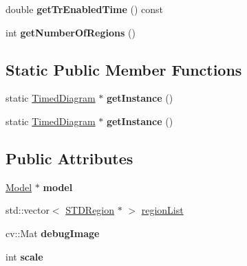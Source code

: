 \begin{DoxyCompactItemize}
\item 
\hypertarget{classTimedDiagram_a5fadc1d768a55ee74864ee05dc1c7c23}{double {\bfseries get\-Tr\-Enabled\-Time} () const }\label{classTimedDiagram_a5fadc1d768a55ee74864ee05dc1c7c23}

\item 
\hypertarget{classTimedDiagram_aa0eafacca33acf296c5bd1219f12fed8}{int {\bfseries get\-Number\-Of\-Regions} ()}\label{classTimedDiagram_aa0eafacca33acf296c5bd1219f12fed8}

\end{DoxyCompactItemize}
\subsection*{Static Public Member Functions}
\begin{DoxyCompactItemize}
\item 
\hypertarget{classTimedDiagram_a9003646431725e6901bf7eacfd2a3775}{static \hyperlink{classTimedDiagram}{Timed\-Diagram} $\ast$ {\bfseries get\-Instance} ()}\label{classTimedDiagram_a9003646431725e6901bf7eacfd2a3775}

\item 
\hypertarget{classTimedDiagram_a45a59b6448eae518ed352328cd703ee3}{static \hyperlink{classTimedDiagram}{Timed\-Diagram} $\ast$ {\bfseries get\-Instance} ()}\label{classTimedDiagram_a45a59b6448eae518ed352328cd703ee3}

\end{DoxyCompactItemize}
\subsection*{Public Attributes}
\begin{DoxyCompactItemize}
\item 
\hypertarget{classTimedDiagram_ad7f4b0079de06896c5e17f59c4fd9a67}{\hyperlink{structModel}{Model} $\ast$ {\bfseries model}}\label{classTimedDiagram_ad7f4b0079de06896c5e17f59c4fd9a67}

\item 
std\-::vector$<$ \hyperlink{classSTDRegion}{S\-T\-D\-Region} $\ast$ $>$ \hyperlink{classTimedDiagram_a78e0edbe8a03e71f0d229891ef4abe11}{region\-List}
\item 
\hypertarget{classTimedDiagram_a8b56e04641a67753c7a9ef544cab634e}{cv\-::\-Mat {\bfseries debug\-Image}}\label{classTimedDiagram_a8b56e04641a67753c7a9ef544cab634e}

\item 
\hypertarget{classTimedDiagram_ae0fdae2d323f9d062946805d7de78a99}{int {\bfseries scale}}\label{classTimedDiagram_ae0fdae2d323f9d062946805d7de78a99}

\end{DoxyCompactItemize}


